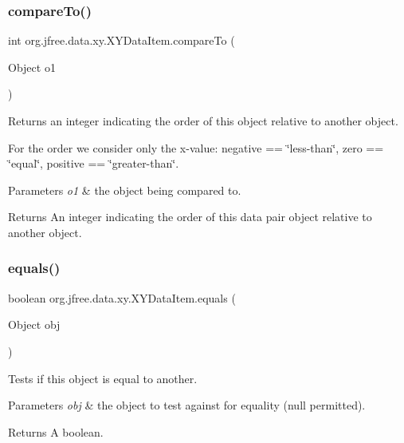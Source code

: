 \subsubsection{\texorpdfstring{compare\+To()}{compareTo()}}
{\footnotesize\ttfamily int org.\+jfree.\+data.\+xy.\+X\+Y\+Data\+Item.\+compare\+To (\begin{DoxyParamCaption}\item[{Object}]{o1 }\end{DoxyParamCaption})}

Returns an integer indicating the order of this object relative to another object. 

For the order we consider only the x-\/value\+: negative == \char`\"{}less-\/than\char`\"{}, zero == \char`\"{}equal\char`\"{}, positive == \char`\"{}greater-\/than\char`\"{}.


\begin{DoxyParams}{Parameters}
{\em o1} & the object being compared to.\\
\hline
\end{DoxyParams}
\begin{DoxyReturn}{Returns}
An integer indicating the order of this data pair object relative to another object. 
\end{DoxyReturn}
\mbox{\label{classorg_1_1jfree_1_1data_1_1xy_1_1_x_y_data_item_a6b0ae7f86ce89bd062f4dd34a309d23c}} 
\subsubsection{\texorpdfstring{equals()}{equals()}}
{\footnotesize\ttfamily boolean org.\+jfree.\+data.\+xy.\+X\+Y\+Data\+Item.\+equals (\begin{DoxyParamCaption}\item[{Object}]{obj }\end{DoxyParamCaption})}

Tests if this object is equal to another.


\begin{DoxyParams}{Parameters}
{\em obj} & the object to test against for equality ({\ttfamily null} permitted).\\
\hline
\end{DoxyParams}
\begin{DoxyReturn}{Returns}
A boolean. 
\end{DoxyReturn}
\mbox{\label{classorg_1_1jfree_1_1data_1_1xy_1_1_x_y_data_item_a54ac12b01a4653c319cc72c1617ae290}} 
